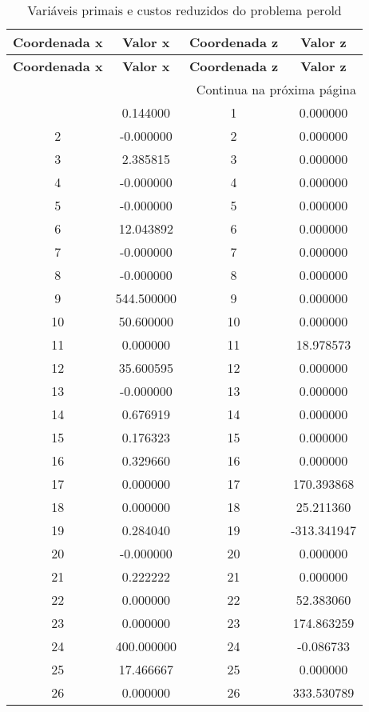 \documentclass[12pt]{article}
\begin{document}
\begin{longtable}{@{}cccc@{}}
\caption{Variáveis primais e custos reduzidos do problema perold} \\
\toprule
\textbf{Coordenada x} & \textbf{Valor x} & \textbf{Coordenada z} & \textbf{Valor z} \\
\midrule
\endfirsthead

\toprule
\textbf{Coordenada x} & \textbf{Valor x} & \textbf{Coordenada z} & \textbf{Valor z} \\
\midrule
\endhead

\midrule \multicolumn{4}{r}{{Continua na próxima página}} \\ \midrule
\endfoot

\bottomrule
\endlastfoot
1 & 0.144000 & 1 & 0.000000 \\
2 & -0.000000 & 2 & 0.000000 \\
3 & 2.385815 & 3 & 0.000000 \\
4 & -0.000000 & 4 & 0.000000 \\
5 & -0.000000 & 5 & 0.000000 \\
6 & 12.043892 & 6 & 0.000000 \\
7 & -0.000000 & 7 & 0.000000 \\
8 & -0.000000 & 8 & 0.000000 \\
9 & 544.500000 & 9 & 0.000000 \\
10 & 50.600000 & 10 & 0.000000 \\
11 & 0.000000 & 11 & 18.978573 \\
12 & 35.600595 & 12 & 0.000000 \\
13 & -0.000000 & 13 & 0.000000 \\
14 & 0.676919 & 14 & 0.000000 \\
15 & 0.176323 & 15 & 0.000000 \\
16 & 0.329660 & 16 & 0.000000 \\
17 & 0.000000 & 17 & 170.393868 \\
18 & 0.000000 & 18 & 25.211360 \\
19 & 0.284040 & 19 & -313.341947 \\
20 & -0.000000 & 20 & 0.000000 \\
21 & 0.222222 & 21 & 0.000000 \\
22 & 0.000000 & 22 & 52.383060 \\
23 & 0.000000 & 23 & 174.863259 \\
24 & 400.000000 & 24 & -0.086733 \\
25 & 17.466667 & 25 & 0.000000 \\
26 & 0.000000 & 26 & 333.530789 \\

\end{longtable}
\end{document}
